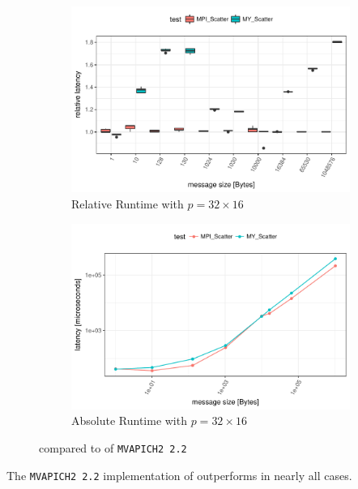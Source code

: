\begin{figure}[H]
    \begin{subfigure}[b]{0.49\textwidth}
        \includegraphics[width=\textwidth]{../benchmarks/mpich/divide_conquer/scatter_32/rel_runtime.pdf}
        \caption{Relative Runtime with $p=32 \times 16$}
        \label{fig:Scatter:MPICH:Rel:32}
    \end{subfigure}
    \begin{subfigure}[b]{0.49\textwidth}
        \includegraphics[width=\textwidth]{../benchmarks/mpich/divide_conquer/scatter_32/runtime.pdf}
        \caption{Absolute Runtime with $p=32 \times 16$}
        \label{fig:Scatter:MPICH:Abs:32}
    \end{subfigure}
    
    \caption{\myscatter compared to \mpiscatter of \texttt{MVAPICH2 2.2}}
\end{figure}

The \texttt{MVAPICH2 2.2} implementation of \mpigather outperforms \mygather in nearly all cases.

